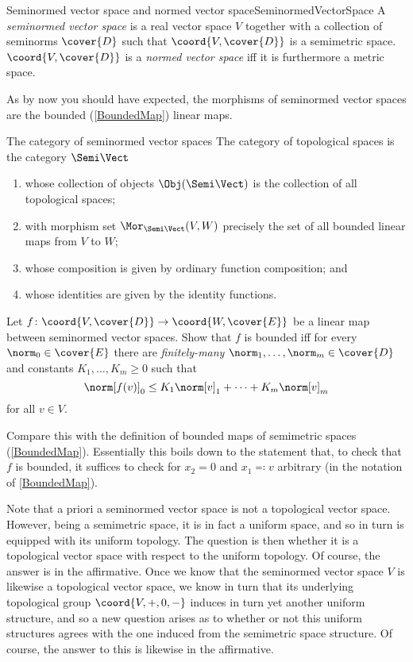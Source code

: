 \begin{dfn}{Seminormed vector space and normed vector space}{SeminormedVectorSpace}
A \emph{seminormed vector space} is a real vector space $V$ together with a collection of seminorms $\cover{D}$ such that $\coord{V,\cover{D}}$ is a semimetric space.  $\coord{V,\cover{D}}$ is a \emph{normed vector space} iff it is furthermore a metric space.
\end{dfn}
As by now you should have expected, the morphisms of seminormed vector spaces are the bounded (\cref{BoundedMap}) linear maps.
\begin{exm}{The category of seminormed vector spaces}{}
The category of topological spaces is the category $\Semi \Vect$\index[notation]{$\Semi \Vect$}
\begin{enumerate}
\item whose collection of objects $\Obj (\Semi \Vect )$ is the collection of all topological spaces;
\item with morphism set $\Mor _{\Semi \Vect}(V,W)$ precisely the set of all bounded linear maps from $V$ to $W$;
\item whose composition is given by ordinary function composition; and
\item whose identities are given by the identity functions.
\end{enumerate}
\end{exm}
\begin{exr}{}{}
Let $f\colon \coord{V,\cover{D}}\rightarrow \coord{W,\cover{E}}$ be a linear map between seminormed vector spaces.  Show that $f$ is bounded iff for every $\norm _0\in \cover{E}$ there are \emph{finitely-many} $\norm _1,\ldots ,\norm _m\in \cover{D}$ and constants $K_1,\ldots ,K_m\geq 0$ such that
\begin{equation}
\norm[f(v)]_0\leq K_1\norm[v]_1+\cdots +K_m\norm[v]_m
\end{equation}
for all $v\in V$.
\begin{rmk}
Compare this with the definition of bounded maps of semimetric spaces (\cref{BoundedMap}).  Essentially this boils down to the statement that, to check that $f$ is bounded, it suffices to check for $x_2=0$ and $x_1\eqqcolon v$ arbitrary (in the notation of \cref{BoundedMap}).
\end{rmk}
\end{exr}
Note that a priori a seminormed vector space is not a topological vector space.  However, being a semimetric space, it is in fact a uniform space, and so in turn is equipped with its uniform topology.  The question is then whether it is a topological vector space with respect to the uniform topology.  Of course, the answer is in the affirmative.  Once we know that the seminormed vector space $V$ is likewise a topological vector space, we know in turn that its underlying topological group $\coord{V,+,0,-}$ induces in turn yet another uniform structure, and so a new question arises as to whether or not this uniform structures agrees with the one induced from the semimetric space structure.  Of course, the answer to this is likewise in the affirmative.
